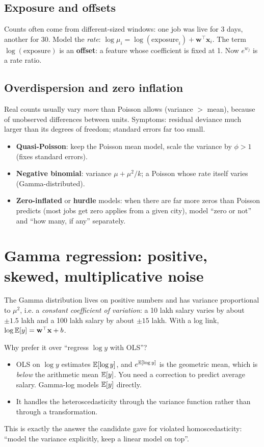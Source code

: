 \subsection{Exposure and offsets}
Counts often come from different-sized windows: one job was live for 3 days, another for 30. Model the \emph{rate}:
$\log\mu_i = \log(\text{exposure}_i) + \mathbf w^\top\mathbf x_i$. The term $\log(\text{exposure})$ is an \textbf{offset}: a
feature whose coefficient is fixed at 1. Now $e^{w_j}$ is a rate ratio.

\subsection{Overdispersion and zero inflation}
Real counts usually vary \emph{more} than Poisson allows (variance $>$ mean), because of unobserved differences between
units. Symptoms: residual deviance much larger than its degrees of freedom; standard errors far too small.
\begin{itemize}
\item \textbf{Quasi-Poisson}: keep the Poisson mean model, scale the variance by $\phi > 1$ (fixes standard errors).
\item \textbf{Negative binomial}: variance $\mu + \mu^2/k$; a Poisson whose rate itself varies (Gamma-distributed).
\item \textbf{Zero-inflated} or \textbf{hurdle} models: when there are far more zeros than Poisson predicts (most jobs
  get zero applies from a given city), model ``zero or not'' and ``how many, if any'' separately.
\end{itemize}

\section{Gamma regression: positive, skewed, multiplicative noise}
The Gamma distribution lives on positive numbers and has variance proportional to $\mu^2$, i.e. a \emph{constant
coefficient of variation}: a 10 lakh salary varies by about $\pm1.5$ lakh and a 100 lakh salary by about $\pm15$
lakh. With a log link, $\log\mathbb{E}[y] = \mathbf w^\top\mathbf x + b$.

Why prefer it over ``regress $\log y$ with OLS''?
\begin{itemize}
\item OLS on $\log y$ estimates $\mathbb{E}[\log y]$, and $e^{\mathbb{E}[\log y]}$ is the geometric mean, which is \emph{below} the
  arithmetic mean $\mathbb{E}[y]$. You need a correction to predict average salary. Gamma-log models $\mathbb{E}[y]$ directly.
\item It handles the heteroscedasticity through the variance function rather than through a transformation.
\end{itemize}
This is exactly the answer the candidate gave for violated homoscedasticity: ``model the variance explicitly, keep a
linear model on top''.


